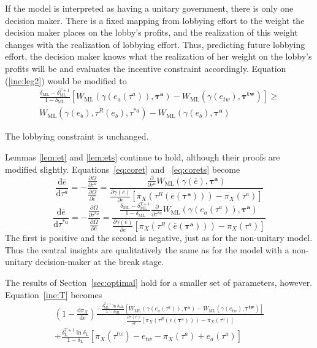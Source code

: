 \documentclass[authoryear, review]{elsarticle}
\newcommand{\ov}{\overline}
\newcommand{\bta}{\bm{\tau^a}}
\newcommand{\ga}{\gamma}
\newcommand{\btw}{\bm{\tau^{tw}}}
\newcommand{\de}{\delta}
\begin{document}
If the model is interpreted as having a unitary government, there is only one decision maker. There is a fixed mapping from lobbying effort to the weight the decision maker places on the lobby's profits, and the realization of this weight changes with the realization of lobbying effort. Thus, predicting future lobbying effort, the decision maker knows what the realization of her weight on the lobby's profits will be and evaluates the incentive constraint accordingly. Equation (\ref{ine:leg2}) would be modified to
\begin{multline}
  \frac{\de_\text{ML} - \de_\text{ML}^{T+1}}{1-\de_\text{ML}} \left[W_\text{ML}(\ga(e_a(\tau^a)),\bta) - W_{\text{ML}}(\ga(e_{tw}),\btw) \right] \geq \\
	W_{\text{ML}}(\ga(e_b),\tau^R(e_b),\tau^{*a}) - W_{\text{ML}}(\ga(e_b),\bta)
  \label{ine:leg3}
\end{multline}

The lobbying constraint is unchanged.

Lemmas \ref{lem:et} and \ref{lem:ets} continue to hold, although their proofs are modified slightly. Equations~\ref{eq:coret} and ~\ref{eq:corets} become
\begin{equation*}
 	\frac{\mathrm{d} \ov{e}}{\mathrm{d} \tau^a} = -\frac{\frac{\partial \Omega}{\partial \tau^a}}{\frac{\partial \Omega}{\partial \ov{e}}} =
	\textstyle \frac{\frac{\partial}{\partial \tau^a}W_\text{ML}(\ga(\ov{e}),\bta)}{\frac{\partial \ga(\ov{e})}{\partial e}\left[ \pi_X(\tau^R(\ov{e}(\bta))) - \pi_X(\tau^{a}) \right]}
	\end{equation*}
\begin{equation*}
	\frac{\mathrm{d} \ov{e}}{\mathrm{d} \tau^{*a}} = -\frac{\frac{\partial \Omega}{\partial \tau^{*a}}}{\frac{\partial \Omega}{\partial \ov{e}}} = 
	\textstyle \frac{\frac{\de_\text{ML} - \de_\text{ML}^{T+1}}{1-\de_\text{ML}} \frac{\partial}{\partial \tau^{*a}}W_\text{ML}(\ga(e_a(\tau^a)),\bta)}{\frac{\partial \ga(\ov{e})}{\partial e}\left[ \pi_X(\tau^R(\ov{e}(\bta))) - \pi_X(\tau^{a}) \right]}
\end{equation*}
The first is positive and the second is negative, just as for the non-unitary model. Thus the central insights are qualitatively the same as for the model with a non-unitary decision-maker at the break stage.

The results of Section~\ref{sec:optimal} hold for a smaller set of parameters, however. Equation~\ref{ine:T} becomes
\begin{multline}
 	\left(1 - \frac{\mathrm{d} \pi_X}{\mathrm{d} \ov{e}} \right) \frac{ -\frac{\de_\text{ML}^{T+1}\ln\de_\text{ML}}{1-\de_\text{ML}}\left[  W_\text{ML}(\ga(e_a(\tau^a)),\bta) - W_\text{ML}(\ga(e_{tw}),\btw) \right]}{\frac{\partial \ga(\ov{e})}{\partial e} \left[ \pi_X(\tau^R(\ov{e}(\bta))) - \pi_X(\tau^a) \right]} \\
	+  \frac{\de_\text{L}^{T+1} \ln \de_\text{L}}{1-\de_\text{L}} \left[ \pi_X(\tau^{tw}) - e_{tw} -\pi_X(\tau^a) + e_a(\tau^a) \right]
	\label{eq:uniopt}
\end{multline}
\end{document}
